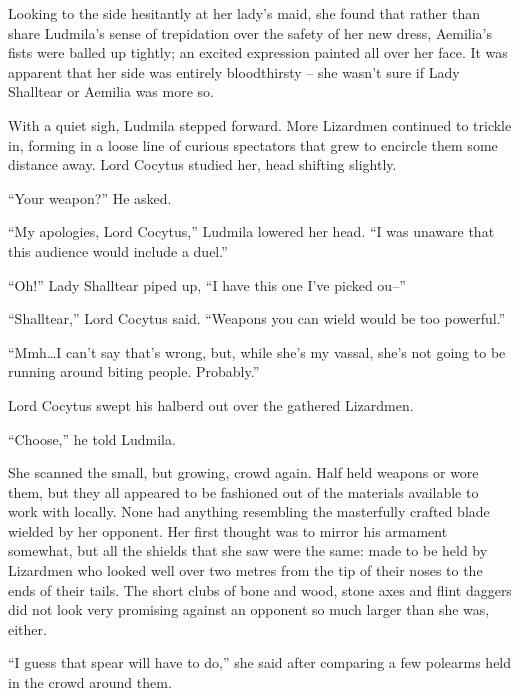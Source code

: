  

Looking to the side hesitantly at her lady’s maid, she found that rather than share Ludmila’s sense of trepidation over the safety of her new dress, Aemilia’s fists were balled up tightly; an excited expression painted all over her face. It was apparent that her side was entirely bloodthirsty – she wasn’t sure if Lady Shalltear or Aemilia was more so.

 

With a quiet sigh, Ludmila stepped forward. More Lizardmen continued to trickle in, forming in a loose line of curious spectators that grew to encircle them some distance away. Lord Cocytus studied her, head shifting slightly.

 

“Your weapon?” He asked.

 

“My apologies, Lord Cocytus,” Ludmila lowered her head. “I was unaware that this audience would include a duel.”

 

“Oh!” Lady Shalltear piped up, “I have this one I’ve picked ou–”

 

“Shalltear,” Lord Cocytus said. “Weapons you can wield would be too powerful.”

 

“Mmh…I can’t say that’s wrong, but, while she’s my vassal, she’s not going to be running around biting people. Probably.”

 

Lord Cocytus swept his halberd out over the gathered Lizardmen.

 

“Choose,” he told Ludmila.

 

She scanned the small, but growing, crowd again. Half held weapons or wore them, but they all appeared to be fashioned out of the materials available to work with locally. None had anything resembling the masterfully crafted blade wielded by her opponent. Her first thought was to mirror his armament somewhat, but all the shields that she saw were the same: made to be held by Lizardmen who looked well over two metres from the tip of their noses to the ends of their tails. The short clubs of bone and wood, stone axes and flint daggers did not look very promising against an opponent so much larger than she was, either.

 

“I guess that spear will have to do,” she said after comparing a few polearms held in the crowd around them.

